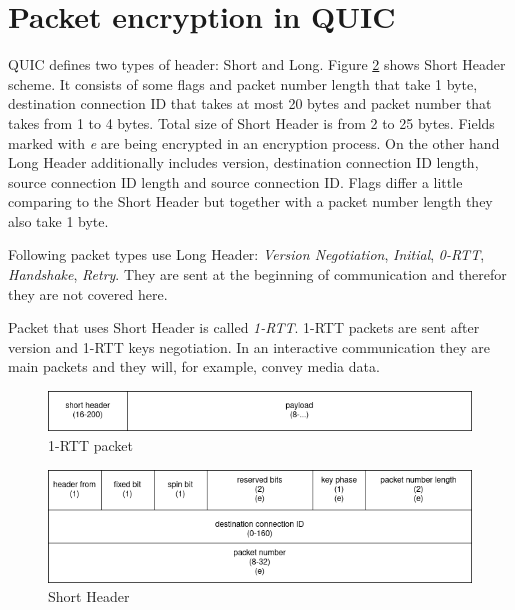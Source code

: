 \section{Packet encryption in QUIC}
\label{sec:packet_enc}
QUIC defines two types of header: Short and Long. 
Figure \ref{fig:short_header} shows Short Header scheme.
It consists of some flags and packet number length that take 1 byte, destination connection ID that takes at most 20 bytes and packet number that takes from 1 to 4 bytes.
Total size of Short Header is from 2 to 25 bytes. 
Fields marked with \textit{e} are being encrypted in an encryption process.
On the other hand Long Header additionally includes version, destination connection ID length, source connection ID length and source connection ID. 
Flags differ a little comparing to the Short Header but together with a packet number length they also take 1 byte. 

Following packet types use Long Header: \textit{Version Negotiation}, \textit{Initial}, \textit{0-RTT}, \textit{Handshake}, \textit{Retry}. 
They are sent at the beginning of communication and therefor they are not covered here.

Packet that uses Short Header is called \textit{1-RTT}. 
1-RTT packets are sent after version and 1-RTT keys negotiation.
In an interactive communication they are main packets and they will, for example, convey media data.

\begin{figure}[h]
    \centering
    \includegraphics[width=\textwidth]{img/1-RTT_packet.png}
    \caption{1-RTT packet}
    \label{fig:1rtt_packet}
\end{figure}

\begin{figure}[h]
    \centering
    \includegraphics[width=\textwidth]{img/header.png}
    \caption{Short Header}
    \label{fig:short_header}
\end{figure}



